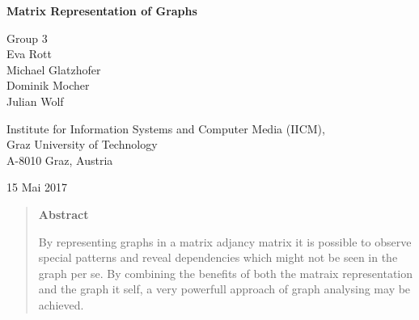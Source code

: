 \documentclass[11pt,onecolumn,twoside]{report}
\begin{document}
\keithdate

\normalsize
\pagestyle{empty}         %




\begin{titlepage}

\begin{center}
{\Large \sffamily \bfseries Matrix Representation of Graphs}

\vspace{1cm}

{\large\sffamily Group 3\\ \vspace*{1cm}}
{\small\sffamily 
Eva Rott\\
Michael Glatzhofer\\
Dominik Mocher\\
Julian Wolf
}


\vspace{1cm}

Institute for Information Systems and Computer Media (IICM), \\
Graz University of Technology \\
A-8010 Graz, Austria \\[1cm]



\vspace{1cm}

{\large 15 Mai 2017}

\end{center}



\vspace{2cm}

\begin{quote}
\begin{center}
{\large\sffamily\bfseries Abstract}
\end{center}

By representing graphs in a matrix adjancy matrix it is possible to observe special patterns and reveal dependencies which might not be seen in the graph per se. By combining the benefits of both the matraix representation and the graph it self, a very powerfull approach of graph analysing may be achieved. 


\end{quote}
\end{titlepage}
\end{document}
